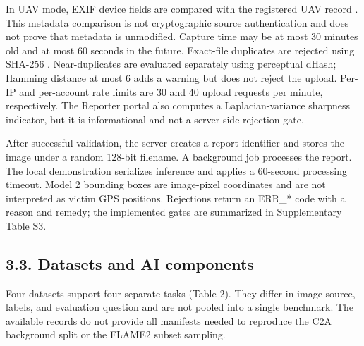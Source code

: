 \documentclass[pdflatex,sn-mathphys-ay]{sn-jnl}
\begin{document}
In UAV mode, EXIF device fields are compared with the registered UAV record \cite{ref17}. This metadata comparison is not cryptographic source authentication and does not prove that metadata is unmodified. Capture time may be at most 30 minutes old and at most 60 seconds in the future. Exact-file duplicates are rejected using SHA-256 \cite{ref18}. Near-duplicates are evaluated separately using perceptual dHash; Hamming distance at most 6 adds a warning but does not reject the upload. Per-IP and per-account rate limits are 30 and 40 upload requests per minute, respectively. The Reporter portal also computes a Laplacian-variance sharpness indicator, but it is informational and not a server-side rejection gate.

After successful validation, the server creates a report identifier and stores the image under a random 128-bit filename. A background job processes the report. The local demonstration serializes inference and applies a 60-second processing timeout. Model 2 bounding boxes are image-pixel coordinates and are not interpreted as victim GPS positions. Rejections return an ERR\_* code with a reason and remedy; the implemented gates are summarized in Supplementary Table S3.

\subsection*{3.3. Datasets and AI components}

Four datasets support four separate tasks (Table 2). They differ in image source, labels, and evaluation question and are not pooled into a single benchmark. The available records do not provide all manifests needed to reproduce the C2A background split or the FLAME2 subset sampling.
\vspace{8pt}
\clearpage
{}
\end{document}

